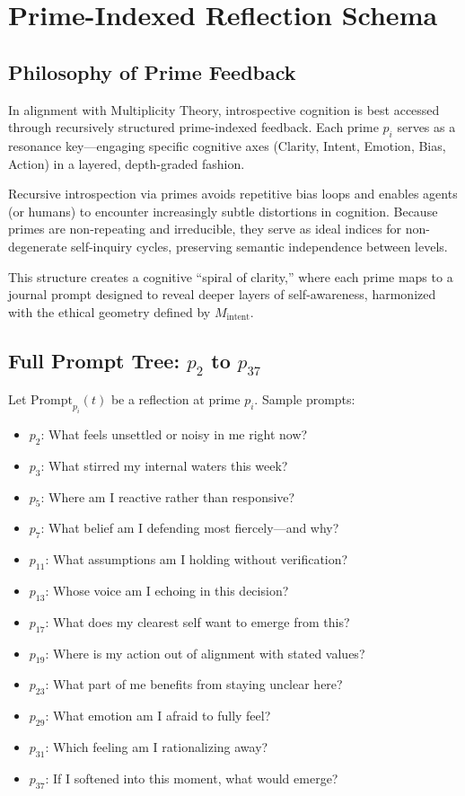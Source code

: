 \documentclass[12pt]{article}
\begin{document}
\section{Prime-Indexed Reflection Schema}

\subsection{Philosophy of Prime Feedback}

In alignment with Multiplicity Theory, introspective cognition is best accessed through recursively structured prime-indexed feedback. Each prime $p_i$ serves as a resonance key—engaging specific cognitive axes (Clarity, Intent, Emotion, Bias, Action) in a layered, depth-graded fashion.

Recursive introspection via primes avoids repetitive bias loops and enables agents (or humans) to encounter increasingly subtle distortions in cognition. Because primes are non-repeating and irreducible, they serve as ideal indices for non-degenerate self-inquiry cycles, preserving semantic independence between levels.

This structure creates a cognitive “spiral of clarity,” where each prime maps to a journal prompt designed to reveal deeper layers of self-awareness, harmonized with the ethical geometry defined by $M_{\text{intent}}$.

\subsection{Full Prompt Tree: $p_2$ to $p_{37}$}

Let $\text{Prompt}_{p_i}(t)$ be a reflection at prime $p_i$. Sample prompts:

\begin{itemize}
    \item $p_2$: What feels unsettled or noisy in me right now?
    \item $p_3$: What stirred my internal waters this week?
    \item $p_5$: Where am I reactive rather than responsive?
    \item $p_7$: What belief am I defending most fiercely—and why?
    \item $p_{11}$: What assumptions am I holding without verification?
    \item $p_{13}$: Whose voice am I echoing in this decision?
    \item $p_{17}$: What does my clearest self want to emerge from this?
    \item $p_{19}$: Where is my action out of alignment with stated values?
    \item $p_{23}$: What part of me benefits from staying unclear here?
    \item $p_{29}$: What emotion am I afraid to fully feel?
    \item $p_{31}$: Which feeling am I rationalizing away?
    \item $p_{37}$: If I softened into this moment, what would emerge?
\end{itemize}
\end{document}
